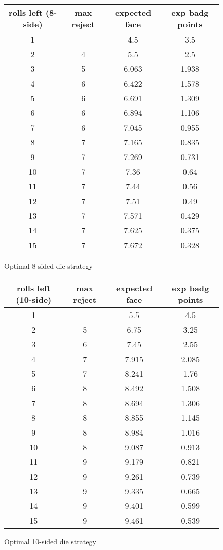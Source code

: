 \documentclass[11pt, oneside]{article} 	%
\begin{document}
\begin{figure}[!htb]
\begin{tabular}{c | c c c}
rolls left (8-side) & max reject & expected face & exp badg points \\
\hline
1 &  & 4.5 & 3.5 \\
2 & \cellcolor{cyan} 4 & 5.5 & 2.5 \\
3 & \cellcolor{cyan} 5 & 6.063 & 1.938 \\
4 & 6 & 6.422 & 1.578 \\
5 & 6 & 6.691 & 1.309 \\
6 & 6 & 6.894 & 1.106 \\
7 & \cellcolor{cyan} 6 & 7.045 & 0.955 \\
8 & 7 & 7.165 & 0.835 \\
9 & 7 & 7.269 & 0.731 \\
10 & 7 & 7.36 & 0.64 \\
11 & 7 & 7.44 & 0.56 \\
12 & 7 & 7.51 & 0.49 \\
13 & 7 & 7.571 & 0.429 \\
14 & 7 & 7.625 & 0.375 \\
15 & 7 & 7.672 & 0.328 \\
\end{tabular}
\caption{Optimal 8-sided die strategy}
\label{fig:optimal8}
\end{figure}


\begin{figure}[!htb]
\begin{tabular}{c | c c c}
rolls left (10-side) & max reject & expected face & exp badg points \\
\hline
1 &  & 5.5 & 4.5 \\
2 & \cellcolor{cyan} 5 & 6.75 & 3.25 \\
3 & \cellcolor{cyan} 6 & 7.45 & 2.55 \\
4 & 7 & 7.915 & 2.085 \\
5 & \cellcolor{cyan} 7 & 8.241 & 1.76 \\
6 & 8 & 8.492 & 1.508 \\
7 & 8 & 8.694 & 1.306 \\
8 & 8 & 8.855 & 1.145 \\
9 & 8 & 8.984 & 1.016 \\
10 & \cellcolor{cyan} 8 & 9.087 & 0.913 \\
11 & 9 & 9.179 & 0.821 \\
12 & 9 & 9.261 & 0.739 \\
13 & 9 & 9.335 & 0.665 \\
14 & 9 & 9.401 & 0.599 \\
15 & 9 & 9.461 & 0.539 \\
\end{tabular}
\caption{Optimal 10-sided die strategy}
\label{fig:optimal10}
\end{figure}
\end{document}
